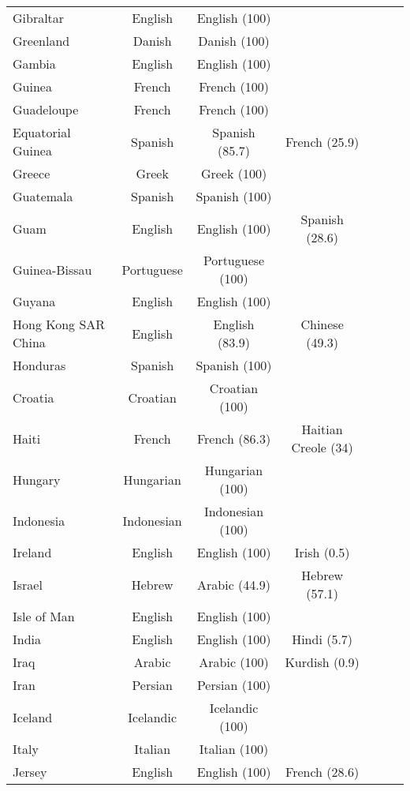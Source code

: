 \begin{longtable}{lc | c | c | c | c | c}
 Gibraltar & English & English (100) &   &   &   &   \\ 
 Greenland & Danish & Danish (100) &   &   &   &   \\ 
 Gambia & English & English (100) &   &   &   &   \\ 
 Guinea & French & French (100) &   &   &   &   \\ 
 Guadeloupe & French & French (100) &   &   &   &   \\ 
 Equatorial Guinea & Spanish & Spanish (85.7) & French (25.9) &   &   &   \\ 
 Greece & Greek & Greek (100) &   &   &   &   \\ 
 Guatemala & Spanish & Spanish (100) &   &   &   &   \\ 
 Guam & English & English (100) & Spanish (28.6) &   &   &   \\ 
 Guinea-Bissau & Portuguese & Portuguese (100) &   &   &   &   \\ 
 Guyana & English & English (100) &   &   &   &   \\ 
 Hong Kong SAR China & English & English (83.9) & Chinese (49.3) &   &   &   \\ 
 Honduras & Spanish & Spanish (100) &   &   &   &   \\ 
 Croatia & Croatian & Croatian (100) &   &   &   &   \\ 
 Haiti & French & French (86.3) & Haitian Creole (34) &   &   &   \\ 
 Hungary & Hungarian & Hungarian (100) &   &   &   &   \\ 
 Indonesia & Indonesian & Indonesian (100) &   &   &   &   \\ 
 Ireland & English & English (100) & Irish (0.5) &   &   &   \\ 
 Israel & Hebrew & Arabic (44.9) & Hebrew (57.1) &   &   &   \\ 
 Isle of Man & English & English (100) &   &   &   &   \\ 
 India & English & English (100) & Hindi (5.7) &   &   &   \\ 
 Iraq & Arabic & Arabic (100) & Kurdish (0.9) &   &   &   \\ 
 Iran & Persian & Persian (100) &   &   &   &   \\ 
 Iceland & Icelandic & Icelandic (100) &   &   &   &   \\ 
 Italy & Italian & Italian (100) &   &   &   &   \\ 
 Jersey & English & English (100) & French (28.6) &   &   &   \\ 

\end{longtable}
